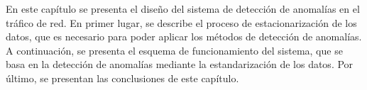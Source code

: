 En este capítulo se presenta el diseño del sistema de detección de anomalías en el tráfico de red. En primer lugar, se describe el proceso de estacionarización de los datos, que es necesario para poder aplicar los métodos de detección de anomalías. A continuación, se presenta el esquema de funcionamiento del sistema, que se basa en la detección de anomalías mediante la estandarización de los datos. Por último, se presentan las conclusiones de este capítulo.
